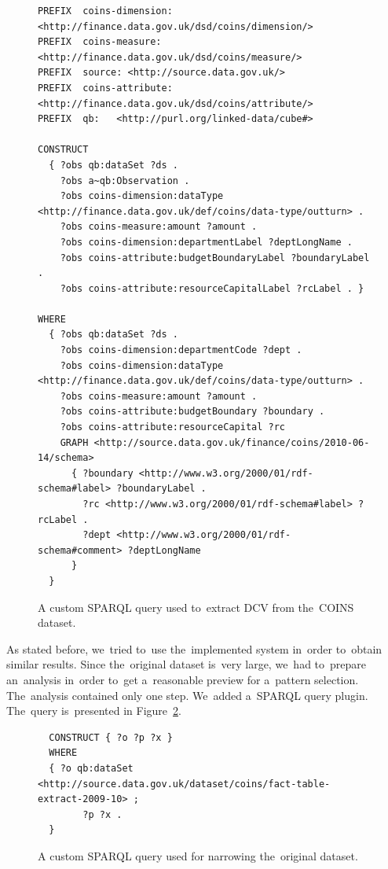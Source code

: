 \begin{figure}
  \scriptsize
\begin{verbatim}
PREFIX  coins-dimension: <http://finance.data.gov.uk/dsd/coins/dimension/>
PREFIX  coins-measure: <http://finance.data.gov.uk/dsd/coins/measure/>
PREFIX  source: <http://source.data.gov.uk/>
PREFIX  coins-attribute: <http://finance.data.gov.uk/dsd/coins/attribute/>
PREFIX  qb:   <http://purl.org/linked-data/cube#>

CONSTRUCT 
  { ?obs qb:dataSet ?ds .
    ?obs a~qb:Observation .
    ?obs coins-dimension:dataType <http://finance.data.gov.uk/def/coins/data-type/outturn> .
    ?obs coins-measure:amount ?amount .
    ?obs coins-dimension:departmentLabel ?deptLongName .
    ?obs coins-attribute:budgetBoundaryLabel ?boundaryLabel .
    ?obs coins-attribute:resourceCapitalLabel ?rcLabel . }

WHERE
  { ?obs qb:dataSet ?ds .
    ?obs coins-dimension:departmentCode ?dept .
    ?obs coins-dimension:dataType <http://finance.data.gov.uk/def/coins/data-type/outturn> .
    ?obs coins-measure:amount ?amount .
    ?obs coins-attribute:budgetBoundary ?boundary .
    ?obs coins-attribute:resourceCapital ?rc
    GRAPH <http://source.data.gov.uk/finance/coins/2010-06-14/schema>
      { ?boundary <http://www.w3.org/2000/01/rdf-schema#label> ?boundaryLabel .
        ?rc <http://www.w3.org/2000/01/rdf-schema#label> ?rcLabel .
        ?dept <http://www.w3.org/2000/01/rdf-schema#comment> ?deptLongName
      }
  }
\end{verbatim}
\caption{A custom SPARQL query used to~extract DCV from the~COINS dataset.}
\label{fig:custom-coins-query}
\end{figure}

As stated before, we~tried to~use the~implemented system in~order to~obtain 
similar results. Since the~original dataset is~very large, we~had to~prepare an~analysis in~order to~get a~reasonable preview for a~pattern selection. The~analysis contained only one step. We~added a~SPARQL query plugin. The~query is~presented
in Figure~\ref{fig:coins-query-narrow}.

\begin{figure}
  \scriptsize
\begin{verbatim}
  CONSTRUCT { ?o ?p ?x }
  WHERE
  { ?o qb:dataSet <http://source.data.gov.uk/dataset/coins/fact-table-extract-2009-10> ;
        ?p ?x .
  }
\end{verbatim}
\caption{A custom SPARQL query used for narrowing the~original dataset.}
\label{fig:coins-query-narrow}
\end{figure}

